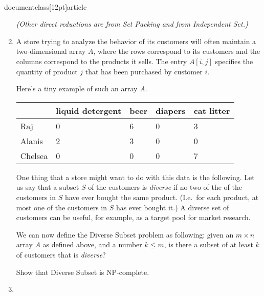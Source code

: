\\documentclass[12pt]{article}
\def\gap{0.2in}
\begin{document}
\begin{enumerate}
{{\em (Other direct reductions are from Set Packing and from
Independent Set.)}

}



\item

A store trying to analyze the behavior of its customers will often
maintain a two-dimensional array $A$, where the rows
correspond to its customers and the columns correspond to
the products it sells.
The entry $A[i,j]$ specifies the quantity of product $j$
that has been purchased by customer $i$.

Here's a tiny example of such an array $A$.
\begin{table}[h]
\begin{center}
\begin{tabular}{@{}|p{1.2in}|p{0.8in}|p{0.8in}|p{0.8in}|p{0.8in}|}
\hline
\mbox{} & {liquid detergent} & {beer} & {diapers} & {cat litter} \\
\hline
Raj & 0 &  6 &  0 &  3
\\\hline
Alanis &  2 &  3 &  0 & 0
\\\hline
Chelsea &  0 &  0 &  0 &  7
\\\hline
\end{tabular}
\end{center}
\end{table}

One thing that a store might want to do with this data
is the following.
Let us say that a subset $S$ of the customers is {\em diverse} if
no two of the of the customers in $S$ have ever bought
the same product.
(I.e.~for each product, at most one of the customers in $S$
has ever bought it.)
A diverse set of customers can be useful, for example, as a target pool
for market research.

We can now define the {\sc Diverse Subset} problem as following:
given an $m \times n$ array $A$ as defined above, and a number $k \leq m$,
is there a subset of at least $k$ of customers that is {\em diverse}?


\vskip \gap
Show that {\sc Diverse Subset} is NP-complete.


\item


\end{enumerate}
\end{document}
